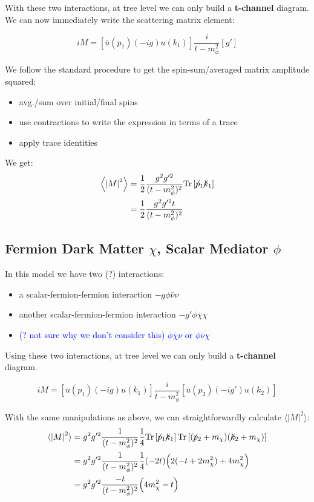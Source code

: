\documentclass[11pt, oneside]{article}   	%
\newcommand{\fsl}[1]{\ensuremath{\mathrlap{\!\not{\phantom{#1}}}#1}}%
\begin{document}
With these two interactions, at tree level we can only build a \textbf{t-channel} diagram.
We can now immediately write the scattering matrix element: 

\[ iM = \left[ \bar{u}(p_1) (-i g) u(k_1) \right] \frac{i}{t-m_\phi^2} \left[ g' \right] \]  

We follow the standard procedure to get the spin-sum/averaged matrix amplitude squared: 
\begin{itemize}
    \item avg./sum over initial/final spins
    \item use contractions to write the expression in terms of a trace
    \item apply trace identities
\end{itemize}
We get: 
\begin{align*}
    \left\langle \left| M \right|^2 \right\rangle &= \frac{1}{2} \frac{g^2g'^2}{(t-m_\phi^2)^2} \text{Tr}\left[ \fsl{p_1} \fsl{k_1} \right] \\ 
    & = \frac{1}{2} \frac{g^2g'^2t}{(t-m_\phi^2)^2}
\end{align*}

\newpage
\subsection{\normalsize Fermion Dark Matter $\chi$, Scalar Mediator $\phi$ } 

In this model we have two (?) interactions:
\begin{itemize}
    \item a scalar-fermion-fermion interaction $-g\phi \bar{\nu}\nu$
    \item another scalar-fermion-fermion interaction $-g' \phi \bar{\chi} \chi$
    \item \textcolor{blue}{(? not sure why we don't consider this) $ \phi \bar{\chi} \nu$ or $\phi \bar{\nu} \chi$}
\end{itemize}

Using these two interactions, at tree level we can only build a \textbf{t-channel} diagram.

\[ iM = \left[ \bar{u}(p_1) (-i g) u(k_1) \right] \frac{i}{t - m_\phi^2} \left[ \bar{u}(p_2) (-i g') u(k_2) \right] \]

With the same manipulations as above, we can straightforwardly calculate $\langle \left| M \right|^2 \rangle$:
\begin{align*}
    \langle \left| M \right|^2 \rangle &= g^2 g'^2 \frac{1}{(t-m_\phi^2)^2} \frac{1}{4} \text{Tr} \left[ \fsl{p_1} \fsl{k_1} \right] \text{Tr} \left[ (\fsl{p_2} + m_\chi)(\fsl{k_2} + m_\chi) \right] \\
    & = g^2 g'^2 \frac{1}{(t-m_\phi^2)^2} \frac{1}{4} (-2t) \Big( 2(-t + 2m_\chi^2) + 4m_\chi^2 \Big) \\
    & = g^2 g'^2 \frac{-t}{(t-m_\phi^2)^2} \Big( 4m_\chi^2 - t \Big)
\end{align*}
\end{document}
